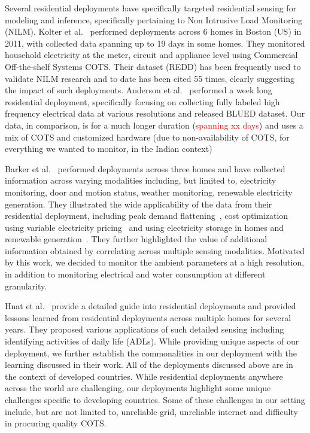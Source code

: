 \documentclass[10pt]{sensys-proc}
\newcommand{\redcolor}[1]{\textcolor{red}{#1}}
\begin{document}
Several residential deployments have specifically targeted residential sensing for modeling and inference, specifically pertaining to Non Intrusive Load Monitoring (NILM). Kolter et al.~\cite{redd} performed deployments across 6 homes in Boston (US) in 2011, with collected data spanning up to 19 days in some homes. They monitored household electricity at the meter, circuit and appliance level using Commercial Off-the-shelf Systems COTS. Their dataset (REDD) has been frequently used to validate NILM research and to date has been cited 55 times, clearly suggesting the impact of such deployments. Anderson et al.~\cite{blued_cmu} performed a week long residential deployment, specifically focusing on collecting fully labeled high frequency electrical data at various resolutions and released BLUED dataset. Our data, in comparison, is for a much longer duration (\redcolor{spanning xx days}) and uses a mix of COTS and customized hardware (due to non-availability of COTS, for everything we wanted to monitor, in the Indian context)

Barker et al.~\cite{smart} performed deployments across three homes and have collected information across varying modalities including, but limited to, electricity monitoring, door and motion status, weather monitoring, renewable electricity generation. They illustrated the wide applicability of the data from their residential deployment, including peak demand flattening~\cite{smartcap}, cost optimization using variable electricity pricing~\cite{smartcharge} and using electricity storage in homes and renewable generation~\cite{cloudy}. They further highlighted the value of additional information obtained by correlating across multiple sensing modalities. Motivated by this work, we decided to monitor the ambient parameters at a high resolution, in addition to monitoring electrical and water consumption at different granularity.

Hnat et al.~\cite{hitchhiker_residential} provide a detailed guide into residential deployments and provided lessons learned from residential deployments across multiple homes for several years. They proposed various applications of such detailed sensing including identifying activities of daily life (ADLs). While providing unique aspects of our deployment, we further establish the commonalities in our deployment with the learning discussed in their work. %
All of the deployments discussed above are in the context of developed countries. While residential deployments anywhere across the world are challenging, our deployments highlight some unique challenges specific to developing countries. Some of these challenges in our setting include, but are not limited to, unreliable grid, unreliable internet and difficulty in procuring quality COTS.
\end{document}
